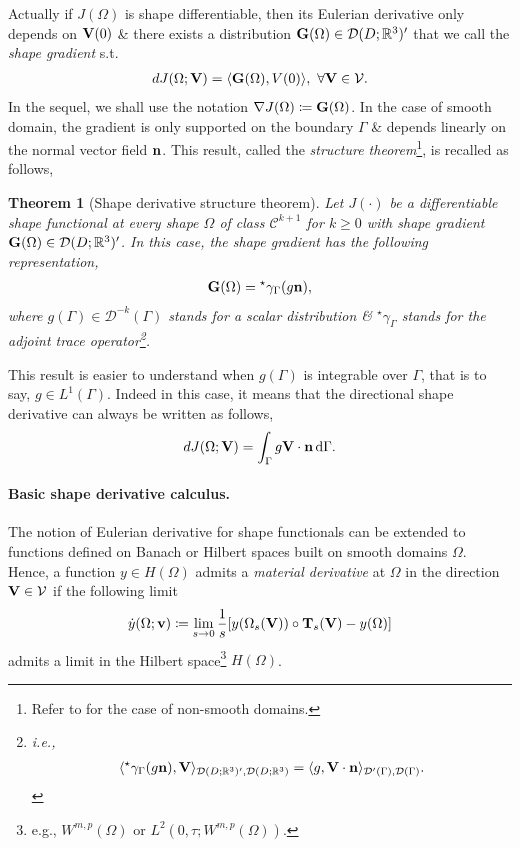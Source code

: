 \documentclass[oneside]{book}
\numberwithin{equation}{section}
\newtheorem{theorem}{Theorem}[chapter]
\begin{document}
Actually if $J(\Omega)$ is shape differentiable, then its Eulerian derivative only depends on ${\bf V}(0)$ \& there exists a distribution ${\bf G}(\Omega)\in\mathcal{D}(D;\mathbb{R}^3)'$ that we call the \textit{shape gradient} s.t.
\begin{align*}
	dJ(\Omega;{\bf V}) = \langle{\bf G}(\Omega),V(0)\rangle,\ \forall{\bf V}\in\mathcal{V}.
\end{align*}
In the sequel, we shall use the notation $\nabla J(\Omega)\coloneqq{\bf G}(\Omega)$. In the case of smooth domain, the gradient is only supported on the boundary $\Gamma$ \& depends linearly on the normal vector field ${\bf n}$. This result, called the \textit{structure theorem}\footnote{Refer to \cite[Theorem 3.5]{Delfour_Zolesio2001} for the case of non-smooth domains.}, is recalled as follows,

\begin{theorem}[Shape derivative structure theorem]
	Let $J(\cdot)$ be a differentiable shape functional at every shape $\Omega$ of class $\mathcal{C}^{k+1}$ for $k\ge 0$ with shape gradient ${\bf G}(\Omega)\in\mathcal{D}(D;\mathbb{R}^3)'$. In this case, the shape gradient has the following representation,
	\begin{align*}
		{\bf G}(\Omega) = {}^\star\gamma_\Gamma(g{\bf n}),
	\end{align*}
	where $g(\Gamma)\in\mathcal{D}^{-k}(\Gamma)$ stands for a scalar distribution \& ${}^\star\gamma_\Gamma$ stands for the adjoint trace operator\footnote{i.e.,
	\begin{align*}
		\langle{}^\star\gamma_\Gamma(g{\bf n}),{\bf V}\rangle_{\mathcal{D}(D;\mathbb{R}^3)',\mathcal{D}(D;\mathbb{R}^3)} = \langle g,{\bf V}\cdot{\bf n}\rangle_{\mathcal{D}'(\Gamma),\mathcal{D}(\Gamma)}.
	\end{align*}}.
\end{theorem}
This result is easier to understand when $g(\Gamma)$ is integrable over $\Gamma$, that is to say, $g\in L^1(\Gamma)$. Indeed in this case, it means that the directional shape derivative can always be written as follows,
\begin{align*}
	dJ(\Omega;{\bf V}) = \int_\Gamma g{\bf V}\cdot{\bf n}\,{\rm d}\Gamma.
\end{align*}

\paragraph{Basic shape derivative calculus.} The notion of Eulerian derivative for shape functionals can be extended to functions defined on Banach or Hilbert spaces built on smooth domains $\Omega$. Hence, a function $y\in H(\Omega)$ admits a \textit{material derivative} at $\Omega$ in the direction ${\bf V}\in\mathcal{V}$ if the following limit
\begin{align*}
	\dot{y}(\Omega;{\bf v})\coloneqq\lim_{s\to 0} \frac{1}{s}[y(\Omega_s({\bf V}))\circ{\bf T}_s({\bf V}) - y(\Omega)]
\end{align*}
admits a limit in the Hilbert space\footnote{e.g., $W^{m,p}(\Omega)$  or $L^2(0,\tau;W^{m,p}(\Omega))$.} $H(\Omega)$.
\end{document}
